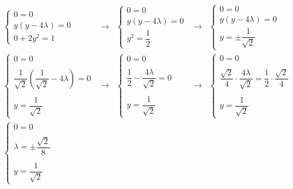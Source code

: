 \documentclass[a4paper]{article}
\begin{document}
	\begin{equation*}
		\begin{array}{lllll}
			\begin{cases}
				0 = 0 \\
				y\left(y - 4\lambda\right) = 0 \\
				0 + 2y^{2} = 1
			\end{cases}
			&\longrightarrow&
			\begin{cases}
				0 = 0 \\
				y\left(y - 4\lambda\right) = 0 \\
				y^{2} = \dfrac{1}{2}
			\end{cases}
			&\longrightarrow&
			\begin{cases}
				0 = 0 \\
				y\left(y - 4\lambda\right) = 0 \\
				y = \pm\dfrac{1}{\sqrt{2}}
			\end{cases} \\ [2.5em]
			\begin{cases}
				0 = 0 \\
				\\
				\dfrac{1}{\sqrt{2}} \left(\dfrac{1}{\sqrt{2}} - 4\lambda\right) = 0 \\
				\\
				y = \dfrac{1}{\sqrt{2}}
			\end{cases}
			&\longrightarrow&
			\begin{cases}
				0 = 0 \\
				\\
				\dfrac{1}{2} - \dfrac{4\lambda}{\sqrt{2}} = 0 \\
				\\
				y = \dfrac{1}{\sqrt{2}}
			\end{cases}
			&\longrightarrow&
			\begin{cases}
				0 = 0 \\
				\\
				\dfrac{\sqrt{2}}{4} \cdot \dfrac{4\lambda}{\sqrt{2}} = \dfrac{1}{2} \cdot \dfrac{\sqrt{2}}{4} \\
				\\
				y = \dfrac{1}{\sqrt{2}}
			\end{cases} \\ [2.5em]
			\begin{cases}
				0 = 0 \\
				\\
				\lambda = \pm\dfrac{\sqrt{2}}{8} \\
				\\
				y = \dfrac{1}{\sqrt{2}}
			\end{cases}
		\end{array}
	\end{equation*}
\end{document}
